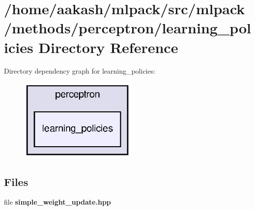 \section{/home/aakash/mlpack/src/mlpack/methods/perceptron/learning\+\_\+policies Directory Reference}
\label{dir_6c1f83a8c807bd60aeee8e610fd4412e}
Directory dependency graph for learning\+\_\+policies\+:
\nopagebreak
\begin{figure}[H]
\begin{center}
\leavevmode
\includegraphics[width=164pt]{dir_6c1f83a8c807bd60aeee8e610fd4412e_dep}
\end{center}
\end{figure}
\subsection*{Files}
\begin{DoxyCompactItemize}
\item 
file \textbf{ simple\+\_\+weight\+\_\+update.\+hpp}
\end{DoxyCompactItemize}
